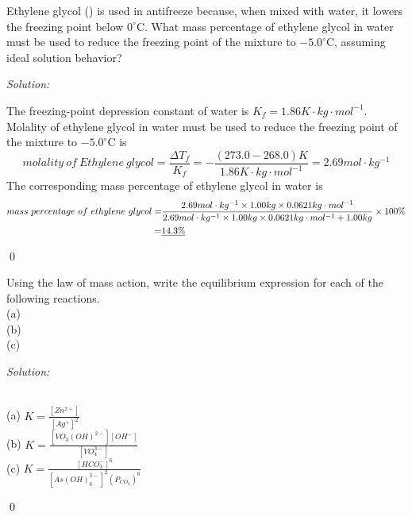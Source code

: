 \documentclass[12pt]{article}
\newenvironment{problem}[2][Problem]{\begin{trivlist}
\item[\hskip \labelsep {\bfseries #1}\hskip \labelsep {\bfseries #2.}]}{\end{trivlist}}
\newenvironment{sol}
    {\emph{Solution:}
    }
    {
    \qed
    }
\begin{document}
\begin{problem}{11.78}
Ethylene glycol () is used in antifreeze because, when mixed with water, it lowers the freezing point below $0 ^\circ$C. What mass percentage of ethylene glycol in water must be used to reduce the freezing point of the mixture to $-5.0 ^\circ$C, assuming ideal solution behavior?
\end{problem}
\begin{sol}
The freezing-point depression constant of water is $K_f=1.86K\cdot kg\cdot mol^{-1}$. Molality of ethylene glycol in water must be used to reduce the freezing point of the mixture to $-5.0 ^\circ$C is
\[
molality~of~Ethylene~glycol=\frac{\Delta T_f}{K_f}=-\frac{(273.0-268.0)K}{1.86K\cdot kg\cdot mol^{-1}}=2.69mol\cdot kg^{-1}
\]
The corresponding mass percentage of ethylene glycol in water is
\footnotesize\begin{align*}
mass~percentage~of~ethylene~glycol=&\frac{2.69mol\cdot kg^{-1}\times1.00kg\times0.0621kg\cdot mol^{-1}}{2.69mol\cdot kg^{-1}\times1.00kg\times0.0621kg\cdot mol^{-1}+1.00kg}\times100\%\\
=&\uline{14.3\%}
\end{align*}\normalsize
\end{sol}

\begin{problem}{14.11}
Using the law of mass action, write the equilibrium expression for each of the following reactions.\\
(a) \\
(b) \\
(c) 
\end{problem}
\begin{sol}
\\(a) $K=\frac{[Zn^{2+}]}{[Ag^+]^2}$\\
(b) $K=\frac{[VO_3(OH)^{2-}][OH^-]}{[VO_4^{3-}]}$\\
(c) $K=\frac{[HCO_3^-]^6}{[As(OH)_6^{3-}]^2(P_{CO_2})^6}$
\end{sol}
\end{document}
